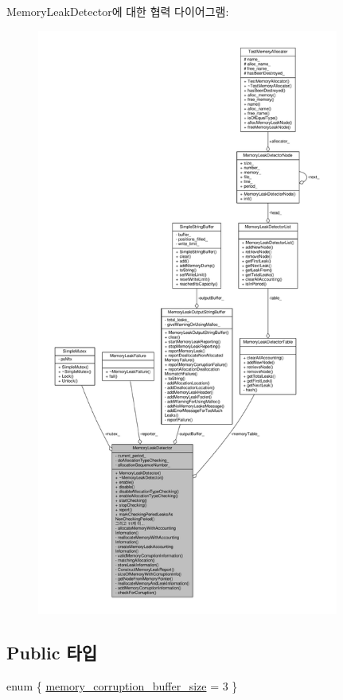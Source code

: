 Memory\+Leak\+Detector에 대한 협력 다이어그램\+:
\nopagebreak
\begin{figure}[H]
\begin{center}
\leavevmode
\includegraphics[height=550pt]{class_memory_leak_detector__coll__graph}
\end{center}
\end{figure}
\subsection*{Public 타입}
\begin{DoxyCompactItemize}
\item 
enum \{ \hyperlink{class_memory_leak_detector_a81929fb3d21206b62f55bcb744f71d5da5220cc4ba0bebf171c9984d05561bcc2}{memory\+\_\+corruption\+\_\+buffer\+\_\+size} = 3
 \}
\end{DoxyCompactItemize}
